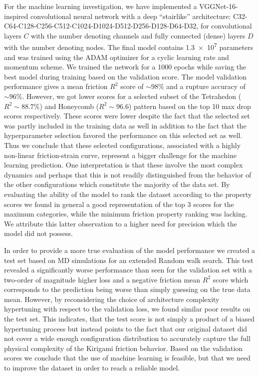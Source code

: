For the machine learning investigation, we have implemented a VGGNet-16-inspired
convolutional neural network with a deep ``stairlike'' architecture:
C32-C64-C128-C256-C512-C1024-D1024-D512-D256-D128-D64-D32, for convolutional
layers $C$ with the number denoting channels and fully connected (dense) layers
$D$ with the number denoting nodes. The final model contains \num{1.3e7} parameters and was trained using the ADAM optimizer for a cyclic learning rate and momentum scheme. We trained the network for a 1000 epochs while saving the best model during training based on the validation score. The model validation performance gives a mean friction $R^2$
score of $\sim 98\%$ and a rupture accuracy of $\sim 96 \%$. However, we got
lower scores for a selected subset of the Tetrahedon ($R^2 \sim 88.7 \%$) and
Honeycomb ($R^2 \sim 96.6$) pattern based on the top 10 max drop scores
respectively. These scores were lower despite the fact that the selected set was
partly included in the training data as well in addition to the fact that the hyperparameter selection favored the performance on this selected set as well. Thus we conclude that these selected configurations, associated with a highly non-linear friction-strain curve, represent a bigger challenge for the machine learning prediction. One interpretation is that these involve
the most complex dynamics and perhaps that this is not readily distinguished
from the behavior of the other configurations which constitute the majority of the data set. By evaluating the ability of the model to rank the dataset according to the property scores we found in general a good representation of the top 3 scores for the maximum categories, while the minimum friction property ranking was lacking. We attribute this latter observation to a higher need for precision which the model did not possess.

In order to provide a more true evaluation of the model performance we created a
test set based on \acrshort{MD} simulations for an extended Random walk search.
This test revealed a significantly worse performance than seen for the
validation set with a two-order of magnitude higher loss and a negative friction
mean $R^2$ score which corresponds to the prediction being worse than simply
guessing on the true data mean. However, by reconsidering the choice of
architecture complexity hypertuning with respect to the validation loss, we
found similar poor results on the test set. This indicates, that the test score
is not simply a product of a biased hypertuning process but instead points to
the fact that our original dataset did not cover a wide enough configuration
distribution to accurately capture the full physical complexity of the Kirigami
friction behavior. Based on the validation scores we conclude that the use of
machine learning is feasible, but that we need to improve the dataset in order
to reach a reliable model. 


